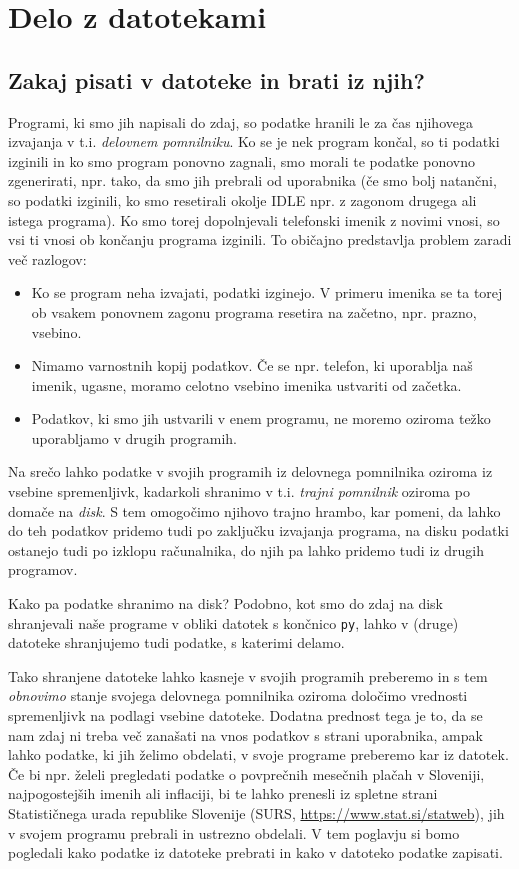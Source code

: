 \chapter{Delo z datotekami}

\section{Zakaj pisati v datoteke in brati iz njih?}

Programi, ki smo jih napisali do zdaj, so podatke hranili le za čas njihovega izvajanja v t.i. \emph{delovnem pomnilniku}. Ko se je nek program končal, so ti podatki izginili in ko smo program ponovno zagnali, smo morali te podatke ponovno zgenerirati, npr. tako, da smo jih prebrali od uporabnika (če smo bolj natančni, so podatki izginili, ko smo resetirali okolje IDLE npr. z zagonom drugega ali istega programa). Ko smo torej dopolnjevali telefonski imenik z novimi vnosi, so vsi ti vnosi ob končanju programa izginili. To običajno predstavlja problem zaradi več razlogov:
\begin{itemize}
    \item Ko se program neha izvajati, podatki izginejo. V primeru imenika se ta torej ob vsakem ponovnem zagonu programa resetira na začetno, npr. prazno, vsebino.
    \item Nimamo varnostnih kopij podatkov. Če se npr. telefon, ki uporablja naš imenik, ugasne, moramo celotno vsebino imenika ustvariti od začetka.
    \item Podatkov, ki smo jih ustvarili v enem programu, ne moremo oziroma težko uporabljamo v drugih programih. 
\end{itemize}
Na srečo lahko podatke v svojih programih iz delovnega pomnilnika oziroma iz vsebine spremenljivk, kadarkoli shranimo v t.i. \emph{trajni pomnilnik} oziroma po domače na \emph{disk}. S tem omogočimo njihovo trajno hrambo, kar pomeni, da lahko do teh podatkov pridemo tudi po zaključku izvajanja programa, na disku podatki ostanejo tudi po izklopu računalnika, do njih pa lahko pridemo tudi iz drugih programov. 

Kako pa podatke shranimo na disk? Podobno, kot smo do zdaj na disk shranjevali naše programe v obliki datotek s končnico \texttt{py}, lahko v (druge) datoteke shranjujemo tudi podatke, s katerimi delamo. 

Tako shranjene datoteke lahko kasneje v svojih programih preberemo in s tem \emph{obnovimo} stanje svojega delovnega pomnilnika oziroma določimo vrednosti spremenljivk na podlagi vsebine datoteke. Dodatna prednost tega je to, da se nam zdaj ni treba več zanašati na vnos podatkov s strani uporabnika, ampak lahko podatke, ki jih želimo obdelati, v svoje programe preberemo kar iz datotek. Če bi npr. želeli pregledati podatke o povprečnih mesečnih plačah v Sloveniji, najpogostejših imenih ali inflaciji, bi te lahko prenesli iz spletne strani Statističnega urada republike Slovenije (SURS, \url{https://www.stat.si/statweb}), jih v svojem programu prebrali in ustrezno obdelali. V tem poglavju si bomo pogledali kako podatke iz datoteke prebrati in kako v datoteko podatke zapisati.

